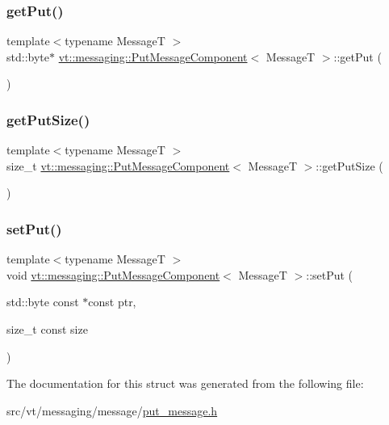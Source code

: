 \subsubsection{\texorpdfstring{get\+Put()}{getPut()}}
{\footnotesize\ttfamily template$<$typename MessageT $>$ \\
std\+::byte$\ast$ \hyperlink{structvt_1_1messaging_1_1_put_message_component}{vt\+::messaging\+::\+Put\+Message\+Component}$<$ MessageT $>$\+::get\+Put (\begin{DoxyParamCaption}{ }\end{DoxyParamCaption})\hspace{0.3cm}{\ttfamily [inline]}}

\mbox{\label{structvt_1_1messaging_1_1_put_message_component_ae5301d5d0a69192e2d5a3fe822f7406b}} 
\subsubsection{\texorpdfstring{get\+Put\+Size()}{getPutSize()}}
{\footnotesize\ttfamily template$<$typename MessageT $>$ \\
size\+\_\+t \hyperlink{structvt_1_1messaging_1_1_put_message_component}{vt\+::messaging\+::\+Put\+Message\+Component}$<$ MessageT $>$\+::get\+Put\+Size (\begin{DoxyParamCaption}{ }\end{DoxyParamCaption})\hspace{0.3cm}{\ttfamily [inline]}}

\mbox{\label{structvt_1_1messaging_1_1_put_message_component_a138c867773a00a0c0d72def222a2a1c2}} 
\subsubsection{\texorpdfstring{set\+Put()}{setPut()}}
{\footnotesize\ttfamily template$<$typename MessageT $>$ \\
void \hyperlink{structvt_1_1messaging_1_1_put_message_component}{vt\+::messaging\+::\+Put\+Message\+Component}$<$ MessageT $>$\+::set\+Put (\begin{DoxyParamCaption}\item[{std\+::byte const $\ast$const}]{ptr,  }\item[{size\+\_\+t const}]{size }\end{DoxyParamCaption})\hspace{0.3cm}{\ttfamily [inline]}}



The documentation for this struct was generated from the following file\+:\begin{DoxyCompactItemize}
\item 
src/vt/messaging/message/\hyperlink{put__message_8h}{put\+\_\+message.\+h}\end{DoxyCompactItemize}
